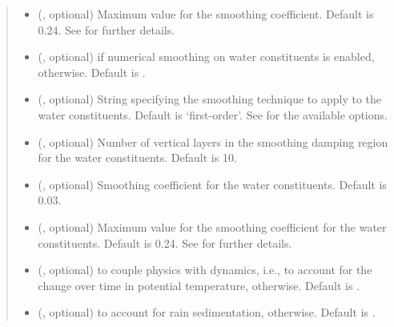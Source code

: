 \documentclass[letterpaper,10pt,english]{sphinxmanual}
\begin{document}
\begin{fulllineitems}
\begin{fulllineitems}
\begin{quote}
\begin{description}
\begin{itemize}
\item {} 
 (, optional) \textendash{} Maximum value for the smoothing coefficient. Default is 0.24.
See {\hyperref[\detokenize{api:dycore.horizontal_smoothing.HorizontalSmoothing}]{}} for further details.

\item {} 
 (, optional) \textendash{}  if numerical smoothing on water constituents is enabled,  otherwise. Default is .

\item {} 
 (, optional) \textendash{} String specifying the smoothing technique to apply to the water constituents. Default is ‘first-order’.
See {\hyperref[\detokenize{api:dycore.horizontal_smoothing.HorizontalSmoothing}]{}} for the available options.

\item {} 
 (, optional) \textendash{} Number of vertical layers in the smoothing damping region for the water constituents. Default is 10.

\item {} 
 (, optional) \textendash{} Smoothing coefficient for the water constituents. Default is 0.03.

\item {} 
 (, optional) \textendash{} Maximum value for the smoothing coefficient for the water constituents. Default is 0.24.
See {\hyperref[\detokenize{api:dycore.horizontal_smoothing.HorizontalSmoothing}]{}} for further details.

\item {} 
 (, optional) \textendash{}  to couple physics with dynamics, i.e., to account for the change over time in potential temperature,
 otherwise. Default is .

\item {} 
 (, optional) \textendash{}  to account for rain sedimentation,  otherwise. Default is .


\end{itemize}
\end{description}
\end{quote}
\end{fulllineitems}
\end{fulllineitems}
\end{document}
